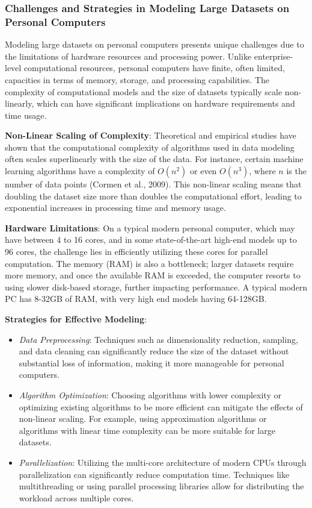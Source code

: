 \documentclass[12pt, twoside,hidelinks]{article}
\theoremstyle{definition}
\numberwithin{equation}{section}
\begin{document}
\subsubsection{Challenges and Strategies in Modeling Large Datasets on Personal Computers}

Modeling large datasets on personal computers presents unique challenges due to the limitations of hardware resources and processing power. Unlike enterprise-level computational resources, personal computers have finite, often limited, capacities in terms of memory, storage, and processing capabilities. The complexity of computational models and the size of datasets typically scale non-linearly, which can have significant implications on hardware requirements and time usage.

\textbf{Non-Linear Scaling of Complexity}: Theoretical and empirical studies have shown that the computational complexity of algorithms used in data modeling often scales superlinearly with the size of the data. For instance, certain machine learning algorithms have a complexity of \( O(n^2) \) or even \( O(n^3) \), where \( n \) is the number of data points (Cormen et al., 2009). This non-linear scaling means that doubling the dataset size more than doubles the computational effort, leading to exponential increases in processing time and memory usage.

\textbf{Hardware Limitations}: On a typical modern personal computer, which may have between 4 to 16 cores, and in some state-of-the-art high-end models up to 96 cores, the challenge lies in efficiently utilizing these cores for parallel computation. The memory (RAM) is also a bottleneck; larger datasets require more memory, and once the available RAM is exceeded, the computer resorts to using slower disk-based storage, further impacting performance. A typical modern PC has 8-32GB of RAM, with very high end models having 64-128GB. 

\textbf{Strategies for Effective Modeling}:
\begin{itemize}
    \item \textit{Data Preprocessing}: Techniques such as dimensionality reduction, sampling, and data cleaning can significantly reduce the size of the dataset without substantial loss of information, making it more manageable for personal computers.
    \item \textit{Algorithm Optimization}: Choosing algorithms with lower complexity or optimizing existing algorithms to be more efficient can mitigate the effects of non-linear scaling. For example, using approximation algorithms or algorithms with linear time complexity can be more suitable for large datasets.
    \item \textit{Parallelization}: Utilizing the multi-core architecture of modern CPUs through parallelization can significantly reduce computation time. Techniques like multithreading or using parallel processing libraries allow for distributing the workload across multiple cores.
\end{itemize}
\end{document}
